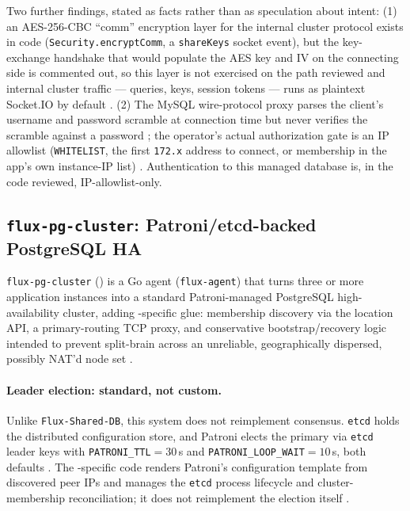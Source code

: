 Two further findings, stated as facts rather than as speculation about intent: (1) an
AES-256-CBC ``comm'' encryption layer for the internal cluster protocol exists in code
(\texttt{Security.\allowbreak{}encryptComm}, a \texttt{shareKeys} socket event), but the
key-exchange handshake that would populate the AES key and IV on the connecting side is
commented out, so this layer is not exercised on the path reviewed and internal cluster
traffic --- queries, keys, session tokens --- runs as plaintext Socket.IO by default
. (2) The MySQL wire-protocol
proxy parses the client's username and password scramble at connection time but never
verifies the scramble against a password
; the operator's actual
authorization gate is an IP allowlist (\texttt{WHITELIST}, the first \texttt{172.x}
address to connect, or membership in the app's own instance-IP list)
. Authentication to this
managed database is, in the code reviewed, IP-allowlist-only.

\subsection{\texttt{flux-\allowbreak{}pg-\allowbreak{}cluster}: Patroni/etcd-backed PostgreSQL HA}
\label{subsec:flux-pg-cluster}

\texttt{flux-\allowbreak{}pg-\allowbreak{}cluster} (\shipped) is a Go agent (\texttt{flux-agent}) that turns three
or more \FluxOS application instances into a standard Patroni-managed PostgreSQL
high-availability cluster, adding \Flux-specific glue: membership discovery via the
\FluxOS location API, a primary-routing TCP proxy, and conservative bootstrap/recovery
logic intended to prevent split-brain across an unreliable, geographically dispersed,
possibly NAT'd node set 
.

\paragraph{Leader election: standard, not custom.} Unlike \texttt{Flux-Shared-DB}, this
system does not reimplement consensus. \texttt{etcd} holds the distributed
configuration store, and Patroni elects the primary via \texttt{etcd} leader keys with
\texttt{PATRONI\_TTL}$=30$\,s and \texttt{PATRONI\_LOOP\_WAIT}$=10$\,s, both defaults
. The \Flux-specific code
renders Patroni's configuration template from discovered peer IPs and manages the
\texttt{etcd} process lifecycle and cluster-membership reconciliation; it does not
reimplement the election itself .

